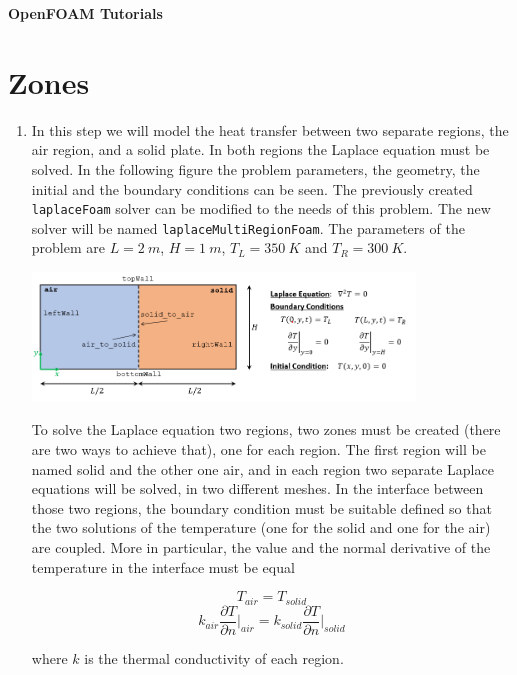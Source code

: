 \documentclass{article}
\begin{document}
\noindent
\begin{huge}
\hspace{-3.0mm}\textbf{OpenFOAM Tutorials}
\end{huge}

\setcounter{section}{2}
\section{Zones}
	
\begin{enumerate}[3.1]
	\item In this step we will model the heat transfer between two separate regions, the air region, and a solid plate. In both regions the Laplace equation must be solved. In the following figure the problem parameters, the geometry, the initial and the boundary conditions can be seen. The previously created {\tt laplaceFoam} solver can be modified to the needs of this problem. The new solver will be named {\tt laplaceMultiRegionFoam}. The parameters of the problem are $L=2~m$, $H=1~m$, $T_L=350~K$ and $T_R=300~K$.
	
	\begin{center}
		\includegraphics[width=0.8\textwidth]{laplace_airSolid.png}
	\end{center}

	To solve the Laplace equation two regions, two zones must be created (there are two ways to achieve that), one for each region. The first region will be named solid and the other one air, and in each region two separate Laplace equations will be solved, in two different meshes. In the interface between those two regions, the boundary condition must be suitable defined so that the two solutions of the temperature (one for the solid and one for the air) are coupled. More in particular, the value and the normal derivative of the temperature in the interface must be equal
	
	$$ 
	T_{air} = T_{solid} 
	$$
	$$	
	k_{air} \dfrac{\partial T}{\partial n} \Bigg|_{air} = k_{solid} \dfrac{\partial T}{\partial n} \Bigg|_{solid} 
	$$
	
	where $k$ is the thermal conductivity of each region. 
	

\end{enumerate}
\end{document}
